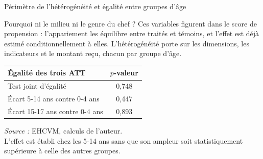 \documentclass[10pt,aspectratio=169]{beamer}
\begin{document}
\begin{frame}{Périmètre de l'hétérogénéité et égalité entre groupes d'âge}
  \begin{block}{Pourquoi ni le milieu ni le genre du chef ?}
    Ces variables figurent dans le score de propension : l'appariement les
    équilibre entre traités et témoins, et l'effet est déjà estimé
    conditionnellement à elles. L'hétérogénéité porte sur les dimensions,
    les indicateurs et le montant reçu, chacun par groupe d'âge.
  \end{block}
  \centering
  \renewcommand{\arraystretch}{1.25}
  \setlength{\tabcolsep}{10pt}
  \begin{tabular}{@{}lc@{}}
    \toprule
    \rowcolor{presvert!88!black}
    \color{white}Égalité des trois ATT & \color{white}$p$-valeur \\
    \midrule
    \rowcolor{presvert!7}
    Test joint d'égalité & 0,748 \\
    Écart 5-14 ans contre 0-4 ans & 0,447 \\
    \rowcolor{presvert!7}
    Écart 15-17 ans contre 0-4 ans & 0,893 \\
    \bottomrule
  \end{tabular}
  \par\smallskip
  {\scriptsize\color{presgris}\textit{Source :} EHCVM, calculs de l'auteur.}\\
  L'effet est établi chez les 5-14 ans sans que son ampleur soit
  statistiquement supérieure à celle des autres groupes.
\end{frame}
\end{document}
